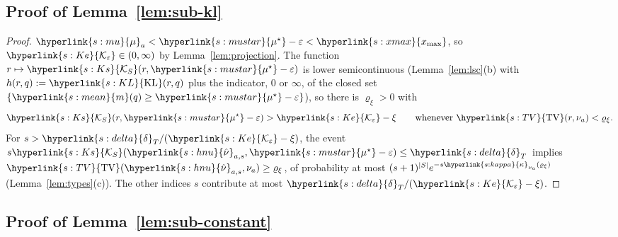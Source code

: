 \documentclass[11pt]{article}
\newcommand{\sy}[2]{{\hyperlink{#1}{#2}}}
\newcommand{\xmax}{\sy{s:xmax}{x_{\max}}}
\newcommand{\mean}{\sy{s:mean}{m}}
\newcommand{\KL}{\sy{s:KL}{\mathrm{KL}}}
\newcommand{\TV}{\sy{s:TV}{\mathrm{TV}}}
\newcommand{\Ks}{\sy{s:Ks}{\mathcal{K}_{S}}}
\newcommand{\mk}{\sy{s:mu}{\mu}}
\newcommand{\mus}{\sy{s:mustar}{\mu^{\star}}}
\newcommand{\hnu}{\sy{s:hnu}{\hat\nu}}
\newcommand{\dl}{\sy{s:delta}{\delta}}
\newcommand{\Ke}{\sy{s:Ke}{\mathcal{K}_{\varepsilon}}}
\newcommand{\kap}{\sy{s:kappa}{\kappa}}
\begin{document}
\subsection{Proof of Lemma~\ref{lem:sub-kl}}\label{sec:proof-lem-sub-kl}

\begin{proof}
$\mk_a<\mus-\varepsilon<\xmax$, so $\Ke\in(0,\infty)$ by Lemma~\ref{lem:projection}. The
function $r\mapsto\Ks(r,\mus-\varepsilon)$ is lower semicontinuous (Lemma~\ref{lem:lsc}(b) with
$h(r,q):=\KL(r,q)$ plus the indicator, $0$ or $\infty$, of the closed set
$\{\mean(q)\ge\mus-\varepsilon\}$), so there is $\varrho_\xi>0$ with
\begin{equation*}
\Ks(r,\mus-\varepsilon)>\Ke-\xi\qquad\text{whenever }\TV(r,\nu_a)<\varrho_\xi .
\end{equation*}
For $s>\dl_T/(\Ke-\xi)$, the event $s\Ks(\hnu_{a,s},\mus-\varepsilon)\le\dl_T$ implies
$\TV(\hnu_{a,s},\nu_a)\ge\varrho_\xi$, of probability at most
$(s+1)^{|S|}e^{-s\kap_{\nu_a}(\varrho_\xi)}$ (Lemma~\ref{lem:types}(c)). The other indices $s$
contribute at most $\dl_T/(\Ke-\xi)$.
\end{proof}

\subsection{Proof of Lemma~\ref{lem:sub-constant}}\label{sec:proof-lem-sub-constant}
\end{document}
